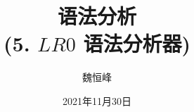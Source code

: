 \documentclass[]{beamer}
\title[语法分析]{语法分析 \\ (5. $LR0$ 语法分析器)}
\author[魏恒峰]{\large 魏恒峰}
\institute{hfwei@nju.edu.cn}
\date{2021年11月30日}
\begin{document}
\maketitle



\thankyou{}

\end{document}
